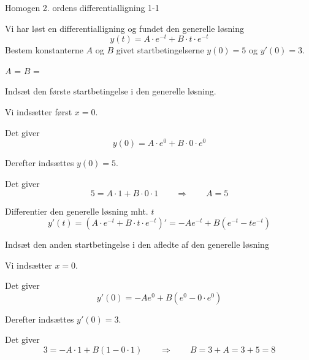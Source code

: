 \documentclass{article}
\begin{document}
\tableofcontents
\newpage


\begin{exercise}{Homogen 2. ordens differentialligning 1-1}

Vi har løst en differentialligning og fundet den generelle løsning
\[
y(t) = A \cdot e^{-t} + B \cdot t \cdot e^{-t}
\]
Bestem konstanterne $A$ og $B$ givet startbetingelserne $y(0)=5$ og $y'(0)=3$.


$A$ = 		
$B$ = 

\hint

Indsæt den første startbetingelse i den generelle løsning. 


\hint

Vi indsætter først $x=0$.

\hint

Det giver
\[
y(0)=  A \cdot e^{0} + B \cdot 0 \cdot e^{0}
\]

\hint

Derefter indsættes $y(0)=5$.

\hint 

Det giver 
\[
5 = A \cdot 1 + B \cdot 0 \cdot 1 \qquad \Rightarrow \qquad A = 5
\]

\hint 

Differentier den generelle løsning mht. $t$
\[
y'(t)= \left(A \cdot e^{-t} + B \cdot t \cdot e^{-t} \right)' = -A e^{-t} + B \left( e^{-t} - t e^{-t} \right)
\]

\hint 

Indsæt den anden startbetingelse i den afledte af den generelle løsning

\hint

Vi indsætter $x=0$.

\hint 

Det giver
\[
y'(0) = -A e^{0} + B \left( e^{0} - 0 \cdot e^{0} \right)
\]

\hint 

Derefter indsættes $y'(0)=3$.

\hint

Det giver
\[
3 = -A \cdot 1 + B \left(1- 0 \cdot 1 \right) \qquad \Rightarrow \qquad B = 3 + A = 3 + 5 = 8
\]






\end{exercise}
\end{document}
